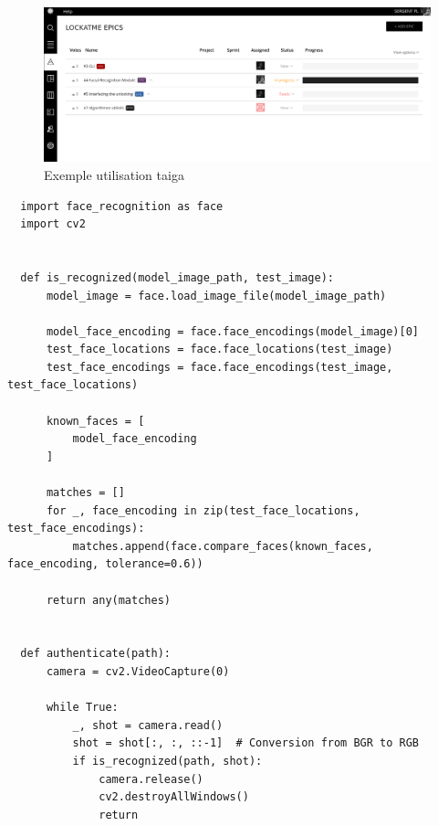 \documentclass[french]{report}
\begin{document}
\begin{figure}[h]\label{fig:Taiga}
  \includegraphics[width=\linewidth]{taiga}
  \caption{Exemple utilisation taiga}
  \label{fig:Taiga}
\end{figure}

\newpage

\begin{verbatim}
  import face_recognition as face
  import cv2


  def is_recognized(model_image_path, test_image):
      model_image = face.load_image_file(model_image_path)

      model_face_encoding = face.face_encodings(model_image)[0]
      test_face_locations = face.face_locations(test_image)
      test_face_encodings = face.face_encodings(test_image, test_face_locations)

      known_faces = [
          model_face_encoding
      ]

      matches = []
      for _, face_encoding in zip(test_face_locations, test_face_encodings):
          matches.append(face.compare_faces(known_faces, face_encoding, tolerance=0.6))

      return any(matches)


  def authenticate(path):
      camera = cv2.VideoCapture(0)

      while True:
          _, shot = camera.read()
          shot = shot[:, :, ::-1]  # Conversion from BGR to RGB
          if is_recognized(path, shot):
              camera.release()
              cv2.destroyAllWindows()
              return
\end{verbatim}
\end{document}

